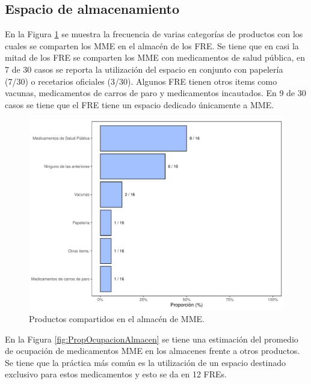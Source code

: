 \documentclass[
]{book}
\begin{document}
\hypertarget{espacio-de-almacenamiento}{%
\subsection{Espacio de almacenamiento}\label{espacio-de-almacenamiento}}

En la Figura \ref{fig:ProductosCompartidos1} se muestra la frecuencia de varias categorías de productos con los cuales se comparten los MME en el almacén de los FRE. Se tiene que en casi la mitad de los FRE se comparten los MME con medicamentos de salud pública, en 7 de 30 casos se reporta la utilización del espacio en conjunto con papelería (7/30) o recetarios oficiales (3/30). Algunos FRE tienen otros items como vacunas, medicamentos de carros de paro y medicamentos incautados. En 9 de 30 casos se tiene que el FRE tiene un espacio dedicado únicamente a MME.

\begin{figure}[!b]

{\centering \includegraphics[width=0.9\linewidth]{InformeFinal_files/figure-latex/ProductosCompartidos1-1} 

}

\caption{Productos compartidos en el almacén de MME.}\label{fig:ProductosCompartidos1}
\end{figure}

En la Figura \ref{fig:PropOcupacionAlmacen} se tiene una estimación del promedio de ocupación de medicamentos MME en los almacenes frente a otros productos. Se tiene que la práctica más común es la utilización de un espacio destinado exclusivo para estos medicamentos y esto se da en 12 FREs.
\end{document}

